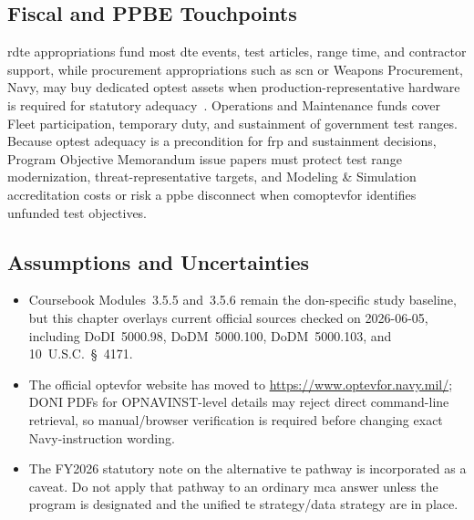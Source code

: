 \documentclass[../main.tex]{subfiles}
\begin{document}
\subsection{Fiscal and PPBE Touchpoints}
\ac{rdte} appropriations fund most \ac{dte} events, test articles, range time, and contractor support, while procurement appropriations such as \ac{scn} or Weapons Procurement, Navy, may buy dedicated \ac{optest} assets when production-representative hardware is required for statutory adequacy~\autocite{DoDFMR-Vol3,edo-3-5-5-test-eval-part-i-2025}. Operations and Maintenance funds cover Fleet participation, temporary duty, and sustainment of government test ranges. Because \ac{optest} adequacy is a precondition for \ac{frp} and sustainment decisions, Program Objective Memorandum issue papers must protect test range modernization, threat-representative targets, and Modeling \& Simulation accreditation costs or risk a \ac{ppbe} disconnect when \ac{comoptevfor} identifies unfunded test objectives.

\subsection{Assumptions and Uncertainties}
\begin{itemize}
  \item Coursebook Modules~3.5.5 and~3.5.6 remain the \ac{don}-specific study baseline, but this chapter overlays current official sources checked on 2026-06-05, including DoDI~5000.98, DoDM~5000.100, DoDM~5000.103, and 10~U.S.C.~\S~4171.
  \item The official \ac{optevfor} website has moved to \url{https://www.optevfor.navy.mil/}; DONI PDFs for OPNAVINST-level details may reject direct command-line retrieval, so manual/browser verification is required before changing exact Navy-instruction wording.
  \item The FY2026 statutory note on the alternative \ac{te} pathway is incorporated as a caveat. Do not apply that pathway to an ordinary \ac{mca} answer unless the program is designated and the unified \ac{te} strategy/data strategy are in place.
\end{itemize}
\end{document}
